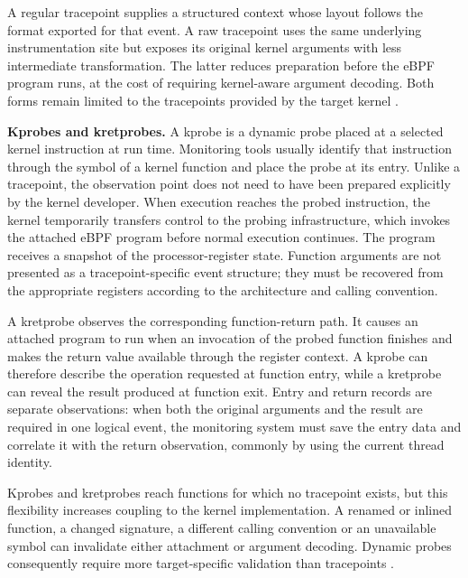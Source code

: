 A regular tracepoint supplies a structured context whose layout follows the
format exported for that event. A raw tracepoint uses the same underlying
instrumentation site but exposes its original kernel arguments with less
intermediate transformation. The latter reduces preparation before the eBPF
program runs, at the cost of requiring kernel-aware argument decoding. Both
forms remain limited to the tracepoints provided by the target kernel
\cite{linux_tracepoints,linux_libbpf_program_types}.

\medskip
\noindent\textbf{Kprobes and kretprobes.}
A kprobe is a dynamic probe placed at a selected kernel instruction at run
time. Monitoring tools usually identify that instruction through the symbol of
a kernel function and place the probe at its entry. Unlike a tracepoint, the
observation point does not need to have been prepared explicitly by the kernel
developer. When execution reaches the probed instruction, the kernel
temporarily transfers control to the probing infrastructure, which invokes the
attached eBPF program before normal execution continues. The program receives
a snapshot of the processor-register state. Function arguments are not
presented as a tracepoint-specific event structure; they must be recovered from
the appropriate registers according to the architecture and calling
convention.

A kretprobe observes the corresponding function-return path. It causes an
attached program to run when an invocation of the probed function finishes and
makes the return value available through the register context. A kprobe can
therefore describe the operation requested at function entry, while a
kretprobe can reveal the result produced at function exit. Entry and return
records are separate observations: when both the original arguments and the
result are required in one logical event, the monitoring system must save the
entry data and correlate it with the return observation, commonly by using the
current thread identity.

Kprobes and kretprobes reach functions for which no tracepoint exists, but this
flexibility increases coupling to the kernel implementation. A renamed or
inlined function, a changed signature, a different calling convention or an
unavailable symbol can invalidate either attachment or argument decoding.
Dynamic probes consequently require more target-specific validation than
tracepoints
\cite{linux_kprobes}.

